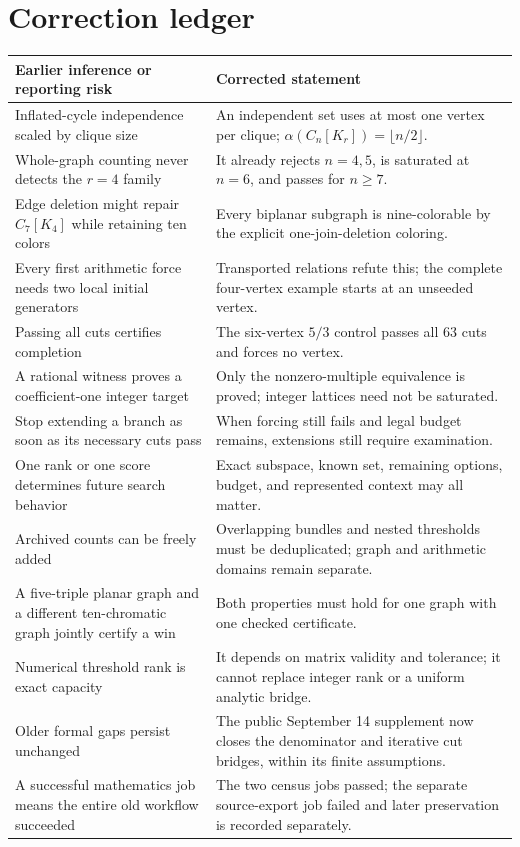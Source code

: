 \documentclass[11pt,letterpaper]{article}
\theoremstyle{definition}
\theoremstyle{remark}\newtheorem{remark}[theorem]{Remark}
\begin{document}
\section{Correction ledger}
\begin{longtable}{p{}p{}}
\toprule Earlier inference or reporting risk&Corrected statement\\\midrule\endhead
Inflated-cycle independence scaled by clique size&An independent set uses at most one vertex per clique; $\alpha(C_n[K_r])=\lfloor n/2\rfloor$.\\
Whole-graph counting never detects the $r=4$ family&It already rejects $n=4,5$, is saturated at $n=6$, and passes for $n\geq7$.\\
Edge deletion might repair $C_7[K_4]$ while retaining ten colors&Every biplanar subgraph is nine-colorable by the explicit one-join-deletion coloring.\\
Every first arithmetic force needs two local initial generators&Transported relations refute this; the complete four-vertex example starts at an unseeded vertex.\\
Passing all cuts certifies completion&The six-vertex $5/3$ control passes all $63$ cuts and forces no vertex.\\
A rational witness proves a coefficient-one integer target&Only the nonzero-multiple equivalence is proved; integer lattices need not be saturated.\\
Stop extending a branch as soon as its necessary cuts pass&When forcing still fails and legal budget remains, extensions still require examination.\\
One rank or one score determines future search behavior&Exact subspace, known set, remaining options, budget, and represented context may all matter.\\
Archived counts can be freely added&Overlapping bundles and nested thresholds must be deduplicated; graph and arithmetic domains remain separate.\\
A five-triple planar graph and a different ten-chromatic graph jointly certify a win&Both properties must hold for one graph with one checked certificate.\\
Numerical threshold rank is exact capacity&It depends on matrix validity and tolerance; it cannot replace integer rank or a uniform analytic bridge.\\
Older formal gaps persist unchanged&The public September 14 supplement now closes the denominator and iterative cut bridges, within its finite assumptions.\\
A successful mathematics job means the entire old workflow succeeded&The two census jobs passed; the separate source-export job failed and later preservation is recorded separately.\\
\bottomrule
\end{longtable}
\end{document}
